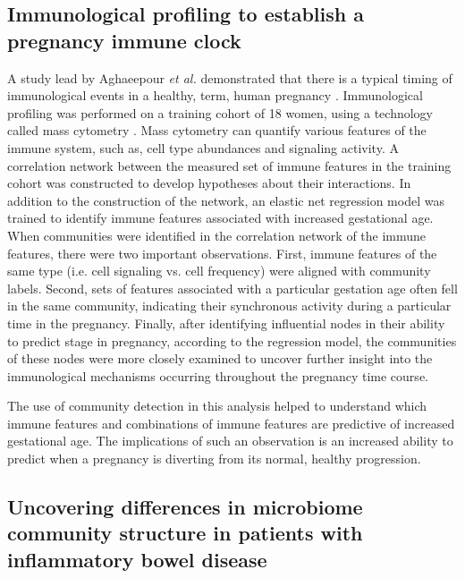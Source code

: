 \subsection{Immunological profiling to establish a pregnancy immune clock}
A study lead by Aghaeepour \emph{et al.} demonstrated that there is a typical timing of immunological events in a healthy, term, human pregnancy \cite{immuneClock}. Immunological profiling was performed on a training cohort of 18 women, using a technology called mass cytometry \cite{cytof}. Mass cytometry can quantify various features of the immune system, such as, cell type abundances and signaling activity. A correlation network between the measured set of immune features in the training cohort was constructed to develop hypotheses about their interactions. In addition to the construction of the network, an elastic net regression model \cite{eNet} was trained to identify immune features associated with increased gestational age. When communities were identified in the correlation network of the immune features, there were two important observations. First, immune features of the same type (i.e. cell signaling vs. cell frequency) were aligned with community labels. Second, sets of features associated with a particular gestation age often fell in the same community, indicating their synchronous activity during a particular time in the pregnancy. Finally, after identifying influential nodes in their ability to predict stage in pregnancy, according to the regression model, the communities of these nodes were more closely examined to uncover further insight into the immunological mechanisms occurring throughout the pregnancy time course. 

The use of community detection in this analysis helped to understand which immune features and combinations of immune features are predictive of increased gestational age. The implications of such an observation is an increased ability to predict when a pregnancy is diverting from its normal, healthy progression. 

\subsection{Uncovering differences in microbiome community structure in patients with inflammatory bowel disease}

